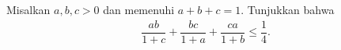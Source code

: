 Misalkan $a,b,c > 0$ dan memenuhi $a+b+c=1$. Tunjukkan bahwa
\begin{align*}
\dfrac{ab}{1+c}+\dfrac{bc}{1+a}+\dfrac{ca}{1+b} \le \dfrac{1}{4}.
\end{align*}